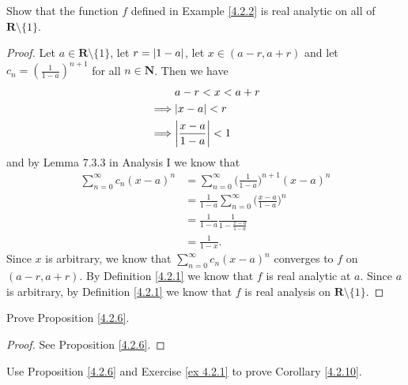 \begin{exercise}\label{ex 4.2.2}
    Show that the function \(f\) defined in Example \ref{4.2.2} is real analytic on all of \(\mathbf{R} \setminus \{1\}\).
\end{exercise}

\begin{proof}
    Let \(a \in \mathbf{R} \setminus \{1\}\), let \(r = \abs*{1 - a}\), let \(x \in (a - r, a + r)\) and let \(c_n = (\frac{1}{1 - a})^{n + 1}\) for all \(n \in \mathbf{N}\).
    Then we have
    \begin{align*}
                 & a - r < x < a + r              \\
        \implies & \abs*{x - a} < r               \\
        \implies & \abs*{\frac{x - a}{1 - a}} < 1
    \end{align*}
    and by Lemma 7.3.3 in Analysis I we know that
    \begin{align*}
        \sum_{n = 0}^\infty c_n (x - a)^n & = \sum_{n = 0}^\infty \bigg(\frac{1}{1 - a}\bigg)^{n + 1} (x - a)^n     \\
                                          & = \frac{1}{1 - a} \sum_{n = 0}^\infty \bigg(\frac{x - a}{1 - a}\bigg)^n \\
                                          & = \frac{1}{1 - a} \frac{1}{1 - \frac{x - a}{1 - a}}                     \\
                                          & = \frac{1}{1 - x}.
    \end{align*}
    Since \(x\) is arbitrary, we know that \(\sum_{n = 0}^\infty c_n (x - a)^n\) converges to \(f\) on \((a - r, a + r)\).
    By Definition \ref{4.2.1} we know that \(f\) is real analytic at \(a\).
    Since \(a\) is arbitrary, by Definition \ref{4.2.1} we know that \(f\) is real analysis on \(\mathbf{R} \setminus \{1\}\).
\end{proof}

\begin{exercise}\label{ex 4.2.3}
    Prove Proposition \ref{4.2.6}.
\end{exercise}

\begin{proof}
    See Proposition \ref{4.2.6}.
\end{proof}

\begin{exercise}\label{ex 4.2.4}
    Use Proposition \ref{4.2.6} and Exercise \ref{ex 4.2.1} to prove Corollary \ref{4.2.10}.
\end{exercise}

